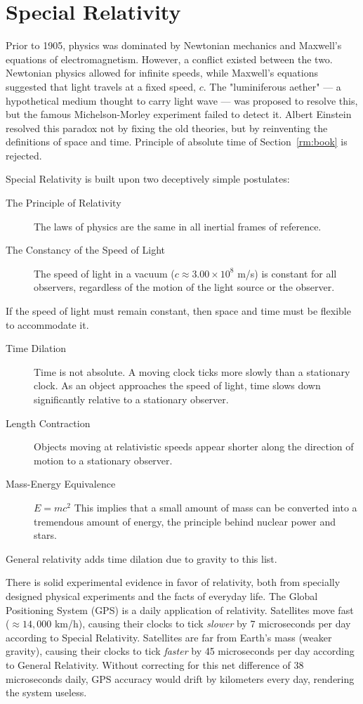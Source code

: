 \chapter{Special Relativity}
\label{ch:sr}

Prior to 1905, physics was dominated by Newtonian mechanics and Maxwell’s 
equations of electromagnetism. However, a conflict existed between 
the two. Newtonian physics allowed for infinite speeds, while Maxwell’s 
equations suggested that light travels at a fixed speed, $c$.
The "luminiferous aether" --- a hypothetical medium thought to carry 
light wave --- was proposed to resolve this, but the famous Michelson-Morley
experiment failed to detect it. Albert Einstein resolved this paradox 
not by fixing the old theories, but by reinventing the definitions of space and time.
Principle of absolute time of Section~\ref{rm:book} is rejected.

Special Relativity  is built upon two deceptively simple postulates:
\begin{description}
    \item [The Principle of Relativity] 
       The laws of physics are the same in all inertial frames of reference.
   \item[The Constancy of the Speed of Light] 
       The speed of light in a vacuum ($c \approx 3.00 \times 10^8$ m/s) is constant for all observers, regardless of the motion of the light source or the observer.
\end{description}

If the speed of light must remain constant, then space and time must be flexible to accommodate it.
\begin{description}
    \item[Time Dilation] Time is not absolute. A moving clock ticks more slowly than a stationary clock. As an object approaches the speed of light, time slows down significantly relative to a stationary observer.
 \item[Length Contraction] Objects moving at relativistic speeds appear shorter along the direction of motion to a stationary observer.
 \item[Mass-Energy Equivalence] 
    $E = mc^2$
    This implies that a small amount of mass can be converted into a tremendous amount of energy, the principle behind nuclear power and stars.
\end{description}
General relativity adds time dilation due to gravity to this list.

There is solid  experimental evidence in favor of relativity, both 
from specially designed physical experiments and the facts of everyday life.
The Global Positioning System (GPS) is a daily application of relativity.
 Satellites move fast ($\approx 14,000$ km/h), causing their clocks to tick {\em slower} by 7 microseconds per day according to Special Relativity.
 Satellites are far from Earth's mass (weaker gravity), causing their clocks to tick {\em faster} by 45 microseconds per day according to General Relativity.
Without correcting for this net difference of 38 microseconds daily, GPS accuracy would drift by kilometers every day, rendering the system useless.

